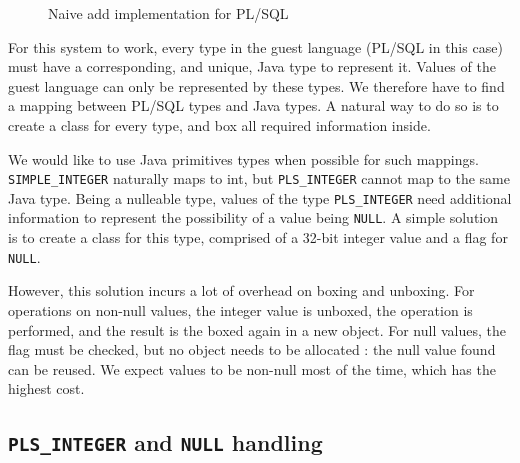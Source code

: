 \documentclass[twoside,11pt,a4paper]{article}
\newcommand{\java}[1]{\textsf{#1}}
\newcommand{\pls}[1]{\small\texttt{#1}\normalsize}
\newcommand{\plstype}[1]{\pls{#1}}
\newcommand{\plsi}{\plstype{PLS\_INTEGER}}
\newcommand{\simpleint}{\plstype{SIMPLE\_INTEGER}}
\newcommand{\plsnull}{\pls{NULL}}
\begin{document}
\begin{figure}[t]
	
	\caption{Naive add implementation for PL/SQL}
	\label{fig:naiveadd}
\end{figure}

For this system to work, every type in the guest language (PL/SQL in this case) must have a corresponding, and unique, Java type to represent it. Values of the guest language can only be represented by these types. We therefore have to find a mapping between PL/SQL types and Java types. A natural way to do so is to create a class for every type, and box all required information inside.

We would like to use Java primitives types when possible for such mappings. \simpleint{} naturally maps to \java{int}, but \plsi{} cannot map to the same Java type. Being a nulleable type, values of the type \plsi{} need additional information to represent the possibility of a value being \plsnull{}. A simple solution is to create a class for this type, comprised of a 32-bit integer value and a flag for \plsnull{}.

However, this solution incurs a lot of overhead on boxing and unboxing. For operations on non-null values, the integer value is unboxed, the operation is performed, and the result is the boxed again in a new object. For null values, the flag must be checked, but no object needs to be allocated : the null value found can be reused. We expect values to be non-null most of the time, which has the highest cost.

\subsection{\plsi{} and \plsnull{} handling}
\end{document}
